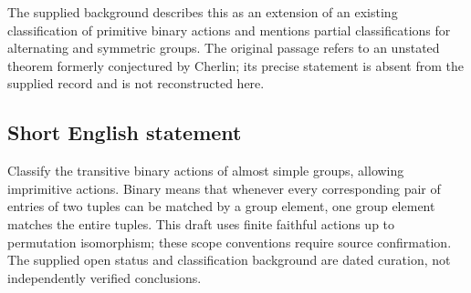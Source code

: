 \documentclass[11pt]{article}
\begin{document}
The supplied background describes this as an extension of an existing classification of primitive binary actions and mentions partial classifications for alternating and symmetric groups. The original passage refers to an unstated theorem formerly conjectured by Cherlin; its precise statement is absent from the supplied record and is not reconstructed here.
\subsection{Short English statement}
Classify the transitive binary actions of almost simple groups, allowing imprimitive actions. Binary means that whenever every corresponding pair of entries of two tuples can be matched by a group element, one group element matches the entire tuples. This draft uses finite faithful actions up to permutation isomorphism; these scope conventions require source confirmation. The supplied open status and classification background are dated curation, not independently verified conclusions.
\end{document}
